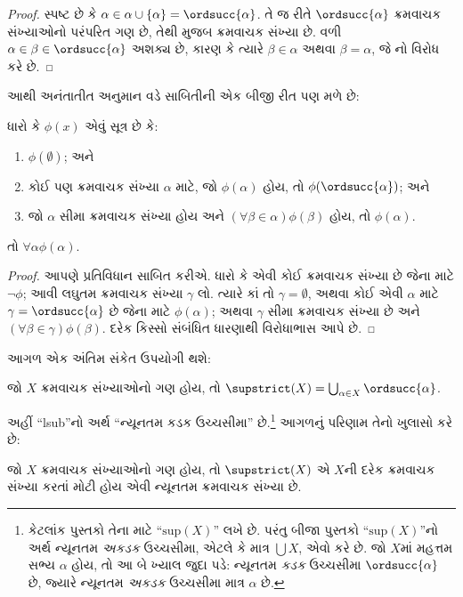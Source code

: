 \begin{proof}
સ્પષ્ટ છે કે $\alpha \in \alpha \cup \{\alpha\} = \ordsucc{\alpha}$.
તે જ રીતે $\ordsucc{\alpha}$ ક્રમવાચક સંખ્યાઓનો પરંપરિત ગણ છે,
તેથી  મુજબ ક્રમવાચક સંખ્યા છે.
વળી $\alpha \in \beta \in \ordsucc{\alpha}$ અશક્ય છે,
કારણ કે ત્યારે $\beta \in \alpha$ અથવા $\beta = \alpha$,
જે નો વિરોધ કરે છે.
\end{proof}
\noindent
આથી અનંતાતીત અનુમાન વડે સાબિતીની એક બીજી રીત પણ મળે છે:

\begin{thm}[સરળ અનંતાતીત અનુમાન]
ધારો કે $\phi(x)$ એવું સૂત્ર છે કે:
\begin{enumerate}
	\item $\phi(\emptyset)$; અને
	\item કોઈ પણ ક્રમવાચક સંખ્યા $\alpha$ માટે, જો $\phi(\alpha)$ હોય, તો
	$\phi(\ordsucc{\alpha})$; અને
	\item જો $\alpha$ સીમા ક્રમવાચક સંખ્યા હોય અને $(\forall \beta \in
	\alpha)\phi(\beta)$ હોય, તો $\phi(\alpha)$.
\end{enumerate}
તો $\forall \alpha \phi(\alpha)$.
\end{thm}

\begin{proof}
આપણે પ્રતિવિધાન સાબિત કરીએ. ધારો કે એવી કોઈ ક્રમવાચક સંખ્યા છે
જેના માટે $\lnot\phi$; આવી લઘુતમ ક્રમવાચક સંખ્યા $\gamma$ લો.
ત્યારે કાં તો $\gamma = \emptyset$, અથવા કોઈ એવી $\alpha$ માટે
$\gamma = \ordsucc{\alpha}$ છે જેના માટે $\phi(\alpha)$;
અથવા $\gamma$ સીમા ક્રમવાચક સંખ્યા છે અને $(\forall
\beta \in \gamma)\phi(\beta)$. દરેક કિસ્સો સંબંધિત ધારણાથી
વિરોધાભાસ આપે છે.
\end{proof}
\noindent
આગળ એક અંતિમ સંકેત ઉપયોગી થશે:

\begin{defn}
જો $X$ ક્રમવાચક સંખ્યાઓનો ગણ હોય, તો $\supstrict(X) = \bigcup_{\alpha
\in X} \ordsucc{\alpha}$.
\end{defn}
\noindent
અહીં ``lsub''નો અર્થ ``ન્યૂનતમ કડક ઉચ્ચસીમા'' છે.\footnote{કેટલાંક
પુસ્તકો તેના માટે ``$\text{sup}(X)$'' લખે છે. પરંતુ બીજા પુસ્તકો
``$\text{sup}(X)$''નો અર્થ ન્યૂનતમ \emph{અકડક} ઉચ્ચસીમા,
એટલે કે માત્ર $\bigcup X$, એવો કરે છે. જો $X$માં મહત્તમ સભ્ય
$\alpha$ હોય, તો આ બે ખ્યાલ જુદા પડે: ન્યૂનતમ \emph{કડક}
ઉચ્ચસીમા $\ordsucc{\alpha}$ છે, જ્યારે ન્યૂનતમ \emph{અકડક}
ઉચ્ચસીમા માત્ર $\alpha$ છે.} આગળનું પરિણામ તેનો ખુલાસો કરે છે:

\begin{prop}
જો $X$ ક્રમવાચક સંખ્યાઓનો ગણ હોય, તો $\supstrict(X)$ એ $X$ની
દરેક ક્રમવાચક સંખ્યા કરતાં મોટી હોય એવી ન્યૂનતમ ક્રમવાચક સંખ્યા છે.
\end{prop}

